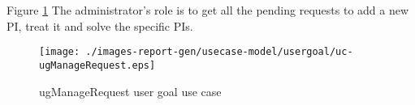 Figure \ref{fig:lu.uni.lassy.excalibur.MyCrash.G02-RE-UCD-uc-ugManageRequest}
The administrator's role is to get all the pending requests to add a new PI, treat it and solve the specific PIs.

\begin{figure}[htbp]
\begin{center}

\texttt{[image: ./images-report-gen/usecase-model/usergoal/uc-ugManageRequest.eps]}
\end{center}
\caption[lu.uni.lassy.excalibur.MyCrash.G02 Use Case Diagram: uc-ugManageRequest]{ugManageRequest user goal use case}
\label{fig:lu.uni.lassy.excalibur.MyCrash.G02-RE-UCD-uc-ugManageRequest}
\end{figure}
\vspace{0.5cm}
